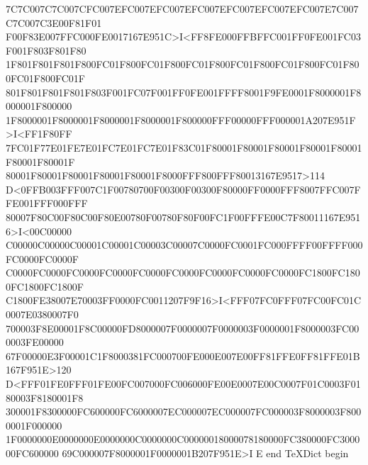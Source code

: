 7C7C007C7C007CFC007EFC007EFC007EFC007EFC007EFC007EFC007E7C007C7C007C3E00F81F01
F00F83E007FFC000FE0017167E951C>I<FF8FE000FFBFFC001FF0FE001FC03F001F803F801F80
1F801F801F801F800FC01F800FC01F800FC01F800FC01F800FC01F800FC01F800FC01F800FC01F
801F801F801F801F803F001FC07F001FF0FE001FFFF8001F9FE0001F8000001F8000001F800000
1F8000001F8000001F8000001F8000001F800000FFF00000FFF000001A207E951F>I<FF1F80FF
7FC01F77E01FE7E01FC7E01FC7E01F83C01F80001F80001F80001F80001F80001F80001F80001F
80001F80001F80001F80001F80001F8000FFF800FFF80013167E9517>114
D<0FFB003FFF007C1F00780700F00300F00300F80000FF0000FFF8007FFC007FFE001FFF000FFF
80007F80C00F80C00F80E00780F00780F80F00FC1F00FFFE00C7F80011167E9516>I<00C00000
C00000C00000C00001C00001C00003C00007C0000FC0001FC000FFFF00FFFF000FC0000FC0000F
C0000FC0000FC0000FC0000FC0000FC0000FC0000FC0000FC0000FC1800FC1800FC1800FC1800F
C1800FE38007E70003FF0000FC0011207F9F16>I<FFF07FC0FFF07FC00FC01C0007E0380007F0
700003F8E00001F8C00000FD8000007F0000007F0000003F0000001F8000003FC000003FE00000
67F00000E3F00001C1F8000381FC000700FE000E007E00FF81FFE0FF81FFE01B167F951E>120
D<FFF01FE0FFF01FE00FC007000FC006000FE00E0007E00C0007F01C0003F0180003F8180001F8
300001F8300000FC600000FC6000007EC000007EC000007FC000003F8000003F8000001F000000
1F0000000E0000000E0000000C0000000C00000018000078180000FC380000FC300000FC600000
69C000007F8000001F0000001B207F951E>I E end
TeXDict begin

